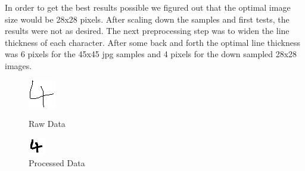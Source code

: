 \documentclass[@CLASSOPTIONS@]{tumarticle}
\begin{document}
In order to get the best results possible we figured out that the optimal image size would be
28x28 pixels.
After scaling down the samples and first tests, the results were not as desired.
The next preprocessing step was to widen the line thickness of each character.
After some back and forth the optimal line thickness was 6 pixels for the 45x45 jpg samples and
4 pixels for the down sampled 28x28 images.

\begin{figure}[!htb]
   \begin{minipage}{0.24\textwidth}
     \centering
     \includegraphics[width=.7\linewidth]{figures/4_clean}
     \caption{Raw Data}\label{Fig:Data1}
   \end{minipage}\hfill
   \begin{minipage}{0.24\textwidth}
     \centering
     \includegraphics[width=.7\linewidth]{figures/4_sampled}
     \caption{Processed Data}\label{Fig:Data2}
   \end{minipage}
\end{figure}
\end{document}

